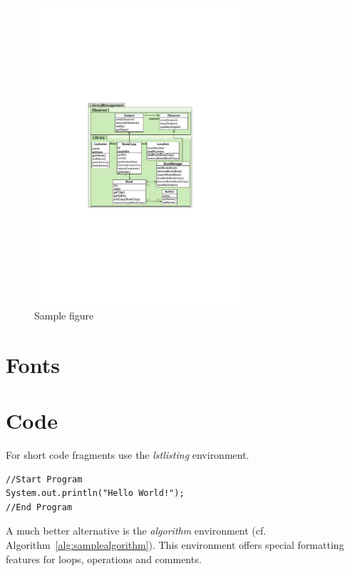 \begin{figure}[tb]
	\centering
	\includegraphics[width=0.7\textwidth]{figures/figure1}
	\caption{Sample figure}
	\label{fig:samplefigure_pdf}
\end{figure}


\section{Fonts}


\section{Code}

For short code fragments use the \textit{lstlisting} environment.

\begin{lstlisting}[caption={Short code},label=shortcode]
//Start Program
System.out.println("Hello World!");
//End Program
\end{lstlisting}

A much better alternative is the \textit{algorithm} environment (cf. Algorithm~\ref{alg:samplealgorithm}). This environment offers special formatting features for loops, operations and comments.

